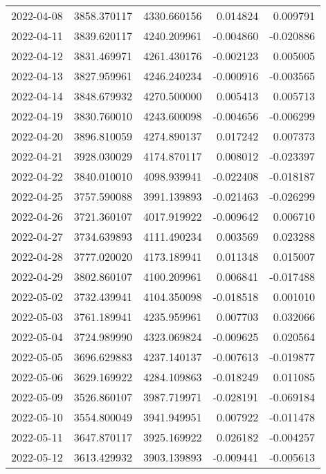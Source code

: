 \begin{tabular}{lrrrr}
2022-04-08 & 3858.370117 & 4330.660156 &        0.014824 &     0.009791 \\
2022-04-11 & 3839.620117 & 4240.209961 &       -0.004860 &    -0.020886 \\
2022-04-12 & 3831.469971 & 4261.430176 &       -0.002123 &     0.005005 \\
2022-04-13 & 3827.959961 & 4246.240234 &       -0.000916 &    -0.003565 \\
2022-04-14 & 3848.679932 & 4270.500000 &        0.005413 &     0.005713 \\
2022-04-19 & 3830.760010 & 4243.600098 &       -0.004656 &    -0.006299 \\
2022-04-20 & 3896.810059 & 4274.890137 &        0.017242 &     0.007373 \\
2022-04-21 & 3928.030029 & 4174.870117 &        0.008012 &    -0.023397 \\
2022-04-22 & 3840.010010 & 4098.939941 &       -0.022408 &    -0.018187 \\
2022-04-25 & 3757.590088 & 3991.139893 &       -0.021463 &    -0.026299 \\
2022-04-26 & 3721.360107 & 4017.919922 &       -0.009642 &     0.006710 \\
2022-04-27 & 3734.639893 & 4111.490234 &        0.003569 &     0.023288 \\
2022-04-28 & 3777.020020 & 4173.189941 &        0.011348 &     0.015007 \\
2022-04-29 & 3802.860107 & 4100.209961 &        0.006841 &    -0.017488 \\
2022-05-02 & 3732.439941 & 4104.350098 &       -0.018518 &     0.001010 \\
2022-05-03 & 3761.189941 & 4235.959961 &        0.007703 &     0.032066 \\
2022-05-04 & 3724.989990 & 4323.069824 &       -0.009625 &     0.020564 \\
2022-05-05 & 3696.629883 & 4237.140137 &       -0.007613 &    -0.019877 \\
2022-05-06 & 3629.169922 & 4284.109863 &       -0.018249 &     0.011085 \\
2022-05-09 & 3526.860107 & 3987.719971 &       -0.028191 &    -0.069184 \\
2022-05-10 & 3554.800049 & 3941.949951 &        0.007922 &    -0.011478 \\
2022-05-11 & 3647.870117 & 3925.169922 &        0.026182 &    -0.004257 \\
2022-05-12 & 3613.429932 & 3903.139893 &       -0.009441 &    -0.005613 \\

\end{tabular}
